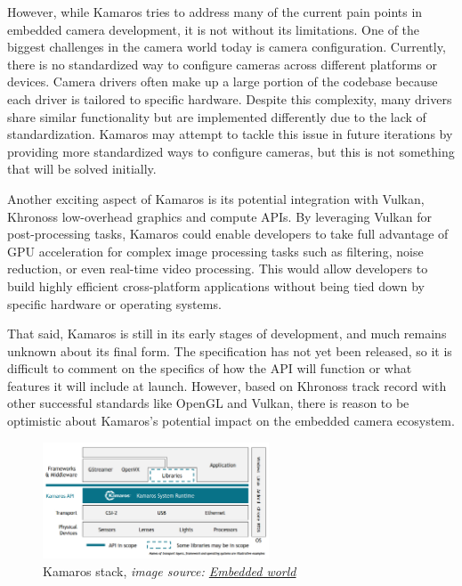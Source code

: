 However, while Kamaros tries to address many of the current pain points in
embedded camera development, it is not without its limitations. One of the
biggest challenges in the camera world today is camera configuration.
Currently, there is no standardized way to configure cameras across different
platforms or devices. Camera drivers often make up a large portion of the
codebase because each driver is tailored to specific hardware. Despite this
complexity, many drivers share similar functionality but are implemented
differently due to the lack of standardization. Kamaros may attempt to tackle
this issue in future iterations by providing more standardized ways to
configure cameras, but this is not something that will be solved initially.

Another exciting aspect of Kamaros is its potential integration with Vulkan,
Khronoss low-overhead graphics and compute APIs. By leveraging Vulkan for
post-processing tasks, Kamaros could enable developers to take full advantage
of GPU acceleration for complex image processing tasks such as filtering,
noise reduction, or even real-time video processing. This would allow
developers to build highly efficient cross-platform applications without being
tied down by specific hardware or operating systems.

That said, Kamaros is still in its early stages of development, and much
remains unknown about its final form. The specification has not yet been
released, so it is difficult to comment on the specifics of how the API will
function or what features it will include at launch. However, based on
Khronoss track record with other successful standards like OpenGL and Vulkan,
there is reason to be optimistic about Kamaros's potential impact on the
embedded camera ecosystem.

\begin{figure}
    \begin{center}
        \includegraphics[width=0.60\textwidth]{figures/kamaros_stack.png}
    \end{center}
    \caption[Kamaros stack]{Kamaros stack, \textit{image source: \href{https://www.khronos.org/assets/uploads/developers/presentations/Khronos\_Kamaros\_Embedded\_World\_Mar23.pdf}{Embedded world}}}\label{fig:kamaros_stack}
\end{figure}


